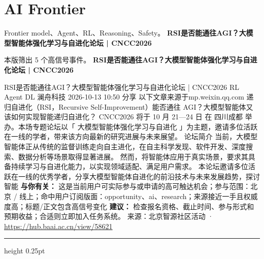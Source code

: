 \documentclass[10.5pt]{ctexart}
\begin{document}
\section*{AI Frontier}
{\color{ormuted} Frontier model、Agent、RL、Reasoning、Safety。}
\vspace{2mm}
{\LARGE\bfseries RSI是否能通往AGI？大模型智能体强化学习与自进化论坛 | CNCC2026}\par
\vspace{1mm}
{\color{ormuted} 本版筛出 5 个高信号事件。}
\vspace{3mm}
{\Large\bfseries RSI是否能通往AGI？大模型智能体强化学习与自进化论坛 | CNCC2026}\par
RSI是否能通往AGI？大模型智能体强化学习与自进化论坛 | CNCC2026 RL Agent DL 澜舟科技 2026-10-13 10:50 分享 以下文章来源于mp.weixin.qq.com 递归自进化（RSI，Recursive Self-Improvement）能否通往 AGI？大模型智能体又该如何实现智能递归自进化？ CNCC2026 将于 10 月 21—24 日 在 四川成都 举办。本场专题论坛以「 大模型智能体强化学习与自进化 」为主题，邀请多位活跃在一线的学者，带来该方向最新的研究进展与未来展望。 论坛简介 当前，大模型智能体正从传统的监督训练走向自主进化，在自主科学发现、软件开发、深度搜索、数据分析等场景取得显著进展。 然而，将智能体应用于真实场景，要求其具备持续学习与自进化能力，以实现领域适配、满足用户需求。 本论坛邀请多位活跃在一线的优秀学者，分享大模型智能体自进化的前沿技术与未来发展趋势，探讨智能
\textbf{与你有关：} 这是当前用户可实际参与或申请的高可触达机会；参与范围：北京 / 线上；命中用户订阅版面：opportunity、ai、research；来源接近一手且权威度高；标题/正文包含高信号变化
\textbf{建议：} 检查报名资格、截止时间、参与形式和预期收益；合适则立即加入任务系统。
{\footnotesize\color{ormuted} 来源：北京智源社区活动 · \url{https://hub.baai.ac.cn/view/58621}}
\vspace{4mm}
\hrule height 0.25pt
\vspace{3mm}
\end{document}
